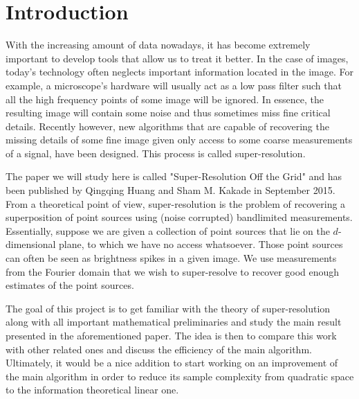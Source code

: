 \chapter{Introduction}
With the increasing amount of data nowadays, it has become extremely important to develop tools that allow us to treat it better. In the case of images, today's technology often neglects important information located in the image. For example, a microscope's hardware will usually act as a low pass filter such that all the high frequency points of some image will be ignored. In essence, the resulting image will contain some noise and thus sometimes miss fine critical details. Recently however, new algorithms that are capable of recovering the missing details of some fine image given only access to some coarse measurements of a signal, have been designed. This process is called super-resolution.\par 

The paper we will study here is called "Super-Resolution Off the Grid" and has been published by Qingqing Huang and Sham M. Kakade in September 2015. From a theoretical point of view, super-resolution is the problem of recovering a superposition of point sources using (noise corrupted) bandlimited measurements. Essentially, suppose we are given a collection of point sources that lie on the $d$-dimensional plane, to which we have no access whatsoever. Those point sources can often be seen as brightness spikes in a given image. We use measurements from the Fourier domain that we wish to super-resolve to recover good enough estimates of the point sources.\par 

The goal of this project is to get familiar with the theory of super-resolution along with all important mathematical preliminaries and study the main result presented in the aforementioned paper. The idea is then to compare this work with other related ones and discuss the efficiency of the main algorithm. Ultimately, it would be a nice addition to start working on an improvement of the main algorithm in order to reduce its sample complexity from quadratic space to the information theoretical linear one.